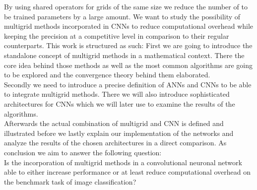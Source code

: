 \documentclass[a4paper,12pt,titlepage,enabledeprecatedfontcommands]{scrreprt}
\begin{document}
By using shared operators for grids of the same size we reduce the number of to be trained parameters by a large amount. We want to study the possibility of multigrid methods incorporated in CNNs to reduce computational overhead while keeping the precision at a competitive level in comparison to their regular counterparts.
This work is structured as such: First we are going to introduce the standalone concept of multigrid methods in a mathematical context. There the core idea behind those methods as well as the most common algorithms are going to be explored and the convergence theory behind them elaborated. \\
Secondly we need to introduce a precise definition of ANNs and CNNs to be able to integrate multigrid methods. There we will also introduce sophisticated architectures for CNNs which we will later use to examine the results of the algorithms. \\
Afterwards the actual combination of multigrid and CNN is defined and illustrated before we lastly explain our implementation of the networks and analyze the results of the chosen architectures in a direct comparison. As conclusion we aim to answer the following question:\\
Is the incorporation of multigrid methods in a convolutional neuronal network able to either increase performance or at least reduce computational overhead on the benchmark task of image classification?
\end{document}
